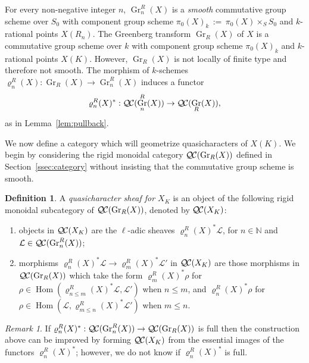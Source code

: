 \documentclass[10pt]{amsart}
\theoremstyle{plain}
\theoremstyle{definition}
\newtheorem{definition}[theorem]{Definition}
\theoremstyle{remark}
\newtheorem{remark}[theorem]{Remark}
\newcommand{\NN}{{\mathbb{N}}}
\newcommand{\Fq}{k}
\DeclareMathOperator{\Hom}{Hom}
\DeclareMathOperator{\Gr}{Gr}
\newcommand{\ceq}{{\, :=\, }}
\newcommand{\qcs}[1]{{\mathcal{#1}}}
\newcommand{\QC}{{\mathcal{Q\hskip-0.8pt C}}}
\begin{document}
For every non-negative integer $n$, $\Gr^R_n(X)$ is a {\it smooth} commutative group scheme over $S_0$
with component group scheme $\pi_0(X)_{\Fq} \ceq \pi_0(X) \times_S S_0$ and $\Fq$-rational points $X(R_n).$
%
The Greenberg transform $\Gr_R(X)$ of $X$ is a commutative group scheme over $\Fq$
with component group scheme $\pi_0(X)_{\Fq}$
and $\Fq$-rational points $X(K).$
However, $\Gr_R(X)$ is not locally of finite type and therefore not smooth.
%
The morphism of $\Fq$-schemes $\varrho^R_n(X) : \Gr_R(X) \to \Gr^R_n(X)$ induces a functor
\[
\varrho^R_n(X)^* : \QC(\Gr^R_n(X)) \to \QC(\Gr_R(X)),
\]
as in Lemma~\ref{lem:pullback}.

We now define a category which will geometrize quasicharacters of $X(K)$.
We begin by considering the rigid monoidal category $\QC(\Gr_R(X))$ defined in Section~\ref{ssec:category} without insisting that the commutative group scheme is smooth.

\begin{definition}
A {\it quasicharacter sheaf for $X_K$} is an object of
the following rigid monoidal subcategory of $\QC(\Gr_R(X))$, denoted by $\QC(X_K)$:
\begin{enumerate}
\item
objects in $\QC(X_K)$ are the $\ell$-adic sheaves $\varrho^R_n(X)^*\qcs{L}$, for $n\in \NN$ and $\qcs{L} \in \QC(\Gr^R_n(X))$; 
\item
morphisms $\varrho^R_n(X)^*\qcs{L} \to \varrho^R_m(X)^*\qcs{L}'$ in $\QC(X_K)$ are those morphisms in $\QC(\Gr_R(X))$ which take the form $\varrho^R_m(X)^*\rho$ for $\rho \in \Hom(\varrho^R_{n\leq m}(X)^*\qcs{L},\qcs{L}')$ when $n\leq m$, and $\varrho^R_n(X)^*\rho$ for $\rho \in \Hom(\qcs{L},\varrho^R_{m\leq n}(X)^*\qcs{L}')$ when $m\leq n$.
\end{enumerate}

\end{definition}


\begin{remark}
If $\varrho^R_n(X)^* : \QC(\Gr^R_n(X)) \to \QC(\Gr_R(X))$ is full then the construction above can be improved by forming $\QC(X_K)$ from the essential images of the functors $\varrho^R_n(X)^*$; however, we do not know if $\varrho^R_n(X)^*$ is full.
\end{remark}
\end{document}
